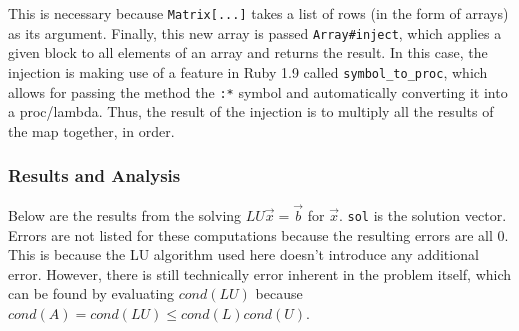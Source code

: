 \documentclass[letterpaper,12pt]{article}
\begin{document}
This is necessary because \texttt{Matrix[...]} takes a list of rows (in the
form of arrays) as its argument.
Finally, this new array is passed \texttt{Array\#inject}, which applies a given
block to all elements of an array and returns the result.
In this case, the injection is making use of a feature in Ruby 1.9 called
\texttt{symbol\_to\_proc}, which allows for passing the method the \texttt{:*}
symbol and automatically converting it into a proc/lambda.
Thus, the result of the injection is to multiply all the results of the map
together, in order.

\subsubsection{Results and Analysis}

Below are the results from the solving $LU\vec{x} = \vec{b}$ for $\vec{x}$.
\texttt{sol} is the solution vector.
Errors are not listed for these computations because the resulting errors are
all 0.
This is because the LU algorithm used here doesn't introduce any additional
error.
However, there is still technically error inherent in the problem itself,
which can be found by evaluating $cond{(LU)}$ because $cond(A) = cond(LU) \le cond(L) cond(U)$.
\end{document}
